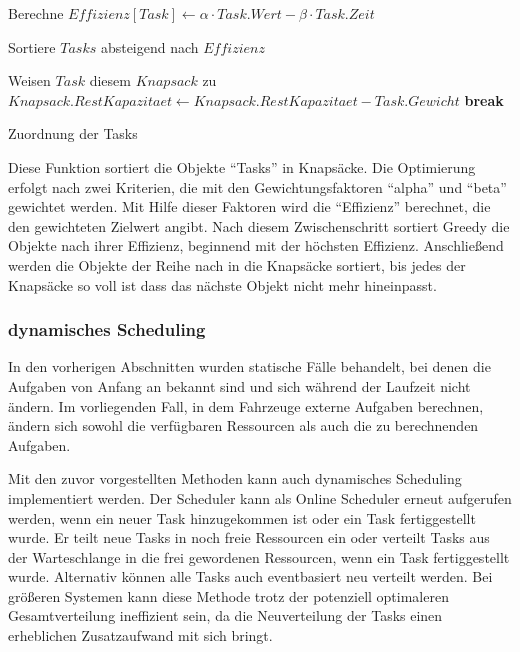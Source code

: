 \begin{algorithmic}
    
        \State Berechne $Effizienz[Task] \leftarrow \alpha \cdot Task.Wert - \beta \cdot Task.Zeit$
    \EndFor
    
    \State Sortiere $Tasks$ absteigend nach $Effizienz$
    
                \State Weisen $Task$ diesem $Knapsack$ zu
                \State $Knapsack.RestKapazitaet \leftarrow Knapsack.RestKapazitaet - Task.Gewicht$
                \State \textbf{break}
            \EndIf
        \EndFor
    \EndFor

    \State \Return Zuordnung der Tasks
    \EndFunction
\end{algorithmic}

Diese Funktion sortiert die Objekte \enquote{Tasks} in Knapsäcke. Die Optimierung erfolgt nach zwei Kriterien, die mit den Gewichtungsfaktoren \enquote{alpha} und \enquote{beta} gewichtet werden. Mit Hilfe dieser Faktoren wird die \enquote{Effizienz} berechnet, die den gewichteten Zielwert angibt. Nach diesem Zwischenschritt sortiert Greedy die Objekte nach ihrer Effizienz, beginnend mit der höchsten Effizienz. Anschließend werden die Objekte der Reihe nach in die Knapsäcke sortiert, bis jedes der Knapsäcke so voll ist dass das nächste Objekt nicht mehr hineinpasst. 

\subsubsection{dynamisches Scheduling}
\label{dynamisches Scheduling}

In den vorherigen Abschnitten wurden statische Fälle behandelt, bei denen die Aufgaben von Anfang an bekannt sind und sich während der Laufzeit nicht ändern. Im vorliegenden Fall, in dem Fahrzeuge externe Aufgaben berechnen, ändern sich sowohl die verfügbaren Ressourcen als auch die zu berechnenden Aufgaben. 

Mit den zuvor vorgestellten Methoden kann auch dynamisches Scheduling implementiert werden. Der Scheduler kann als Online Scheduler erneut aufgerufen werden, wenn ein neuer Task hinzugekommen ist oder ein Task fertiggestellt wurde. Er teilt neue Tasks in noch freie Ressourcen ein oder verteilt Tasks aus der Warteschlange in die frei gewordenen Ressourcen, wenn ein Task fertiggestellt wurde. Alternativ können alle Tasks auch eventbasiert neu verteilt werden. Bei größeren Systemen kann diese Methode trotz der potenziell optimaleren Gesamtverteilung ineffizient sein, da die Neuverteilung der Tasks einen erheblichen Zusatzaufwand mit sich bringt.

